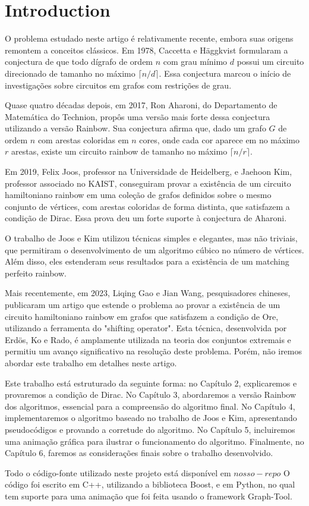 
\chapter{Introduction}

O problema estudado neste artigo é relativamente recente, embora suas origens remontem a conceitos clássicos. 
Em 1978, Caccetta e Häggkvist formularam a conjectura de que todo dígrafo de ordem $n$ com grau 
mínimo $d$ possui um circuito direcionado de tamanho no máximo $\lceil n/d \rceil$. Essa 
conjectura marcou o início de investigações sobre circuitos em grafos com restrições de grau.

Quase quatro décadas depois, em 2017, Ron Aharoni, do Departamento de Matemática do Technion, 
propôs uma versão mais forte dessa conjectura utilizando a versão Rainbow. Sua conjectura
afirma que, dado um grafo $G$ de ordem $n$ com arestas coloridas em $n$ cores, onde cada cor 
aparece em no máximo $r$ arestas, existe um circuito rainbow de tamanho no máximo $\lceil n/r \rceil$.

Em 2019, Felix Joos, professor na Universidade de Heidelberg, e Jaehoon Kim, professor associado 
no KAIST, conseguiram provar a existência de um circuito hamiltoniano rainbow em uma coleção de 
grafos definidos sobre o mesmo conjunto de vértices, com arestas coloridas de forma distinta, 
que satisfazem a condição de Dirac. Essa prova deu um forte suporte à conjectura de Aharoni.

O trabalho de Joos e Kim utilizou técnicas simples e elegantes, mas não triviais, 
que permitiram o desenvolvimento de um algoritmo cúbico no número de vértices. Além disso, eles 
estenderam seus resultados para a existência de um matching perfeito rainbow.

Mais recentemente, em 2023, Liqing Gao e Jian Wang, pesquisadores chineses, publicaram um artigo 
que estende o problema ao provar a existência de um circuito hamiltoniano rainbow em grafos que 
satisfazem a condição de Ore, utilizando a ferramenta do "shifting operator". Esta técnica, 
desenvolvida por Erdös, Ko e Rado, é amplamente utilizada na teoria dos conjuntos extremais e 
permitiu um avanço significativo na resolução deste problema. Porém, não iremos abordar este
trabalho em detalhes neste artigo.

Este trabalho está estruturado da seguinte forma: no Capítulo 2, explicaremos e provaremos a 
condição de Dirac. No Capítulo 3, abordaremos a versão Rainbow dos algoritmos, essencial para a 
compreensão do algoritmo final. No Capítulo 4, implementaremos o algoritmo baseado no trabalho 
de Joos e Kim, apresentando pseudocódigos e provando a corretude do algoritmo. No Capítulo 5, 
incluiremos uma animação gráfica para ilustrar o funcionamento do algoritmo. Finalmente, no 
Capítulo 6, faremos as considerações finais sobre o trabalho desenvolvido.

Todo o código-fonte utilizado neste projeto está disponível em $nosso-repo$ 
O código foi escrito em C++, utilizando a biblioteca Boost, e em Python, no qual tem suporte para 
uma animação que foi feita usando o framework Graph-Tool.
